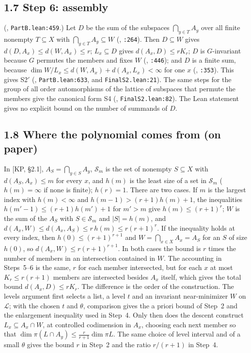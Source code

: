 \documentclass[11pt]{amsart}
\newcommand{\Lc}{\mathcal{L}}
\begin{document}
\subsection*{1.7 Step 6: assembly}
(, \texttt{PartB.lean:459}.) Let $D$ be the sum of the subspaces $\bigcap_{y\in T}A_y$ over all
finite nonempty $T\subseteq X$ with $\bigcap_{y\in T}A_y\subseteq W$ (, \texttt{:264}). Then $D\subseteq W$
gives $d(D,A_x)\le d(W,A_x)\le r$; $L_x\subseteq D$ gives $d(A_x,D)\le rK_r$; $D$ is $G$-invariant because $G$ permutes the
members and fixes $W$ (, \texttt{:446}); and $D$ is a finite sum, because
$\dim W/L_x\le d(W,A_x)+d(A_x,L_x)<\infty$ for one $x$ (, \texttt{:353}). This gives S2$'$
(, \texttt{PartB.lean:633}, and \texttt{FinalS2.lean:21}). The same steps for
the group of all order automorphisms of the lattice of subspaces that permute the members give the canonical form S4
(, \texttt{FinalS2.lean:82}). The Lean statement gives no explicit bound on the
number of summands of $D$.

\subsection*{1.8 Where the polynomial comes from (on paper)}
In [KP, \S2.1], $A_S=\bigcap_{y\in S}A_y$, $\mathcal S_m$ is the set of nonempty $S\subseteq X$ with
$d(A_S,A_x)\le m$ for every $x$, and $h(m)$ is the least size of a set in $\mathcal S_m$ ($h(m)=\infty$ if none is finite);
$h(r)=1$. There are two cases. If $m$ is the
largest index with $h(m)<\infty$ and $h(m-1)>(r+1)h(m)+1$, the inequalities $h(m'-1)\le(r+1)h(m')+1$ for $m'>m$ give
$h(m)\le(r+1)^r$; $W$ is the sum of the $A_S$ with $S\in\mathcal S_m$ and $|S|=h(m)$, and
$d(A_x,W)\le d(A_x,A_S)\le r\,h(m)\le r(r+1)^r$. If the inequality holds at every index, then $h(0)\le(r+1)^{r+1}$ and
$W=\bigcap_{x\in X}A_x=A_S$ for an $S$ of size $h(0)$, so $d(A_x,W)\le r(r+1)^{r+1}$. In both cases the bound is $r$ times
the number of members in an intersection contained in $W$. The accounting in Steps~5--6 is the same, $r$ for each member
intersected, but for each $x$ at most $K_r\le r(r+1)$ members are intersected besides $A_x$ itself, which gives the total
bound $d(A_x,D)\le rK_r$. The difference is the order of the construction. The levels argument first selects a list, a
level $t$ and an invariant near-minimizer $W$ on $\Lc$; with the chosen $t$ and $\theta$, comparison gives the a priori
bound of Step~2 and the enlargement inequality used in Step~4. Only then does the descent construct $L_x\subseteq A_x\cap
W$, at controlled codimension in $A_x$, choosing each next member so that $\dim\pi(L\cap A_y)\le\frac r{r+1}\dim\pi L$.
The same choice of level interval and of a small $\theta$ gives the bound $r$ in Step~2 and the ratio $r/(r+1)$ in
Step~4.
\end{document}
